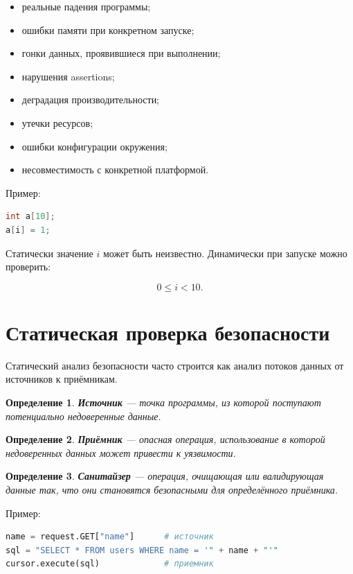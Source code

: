 \documentclass[12pt,a4paper]{article}
\newtheorem{definition}{Определение}
\begin{document}
\begin{itemize}
  \item реальные падения программы;
  \item ошибки памяти при конкретном запуске;
  \item гонки данных, проявившиеся при выполнении;
  \item нарушения assertions;
  \item деградация производительности;
  \item утечки ресурсов;
  \item ошибки конфигурации окружения;
  \item несовместимость с конкретной платформой.
\end{itemize}

Пример:

\begin{lstlisting}[language=C]
int a[10];
a[i] = 1;
\end{lstlisting}

Статически значение $i$ может быть неизвестно. Динамически при запуске можно проверить:

\[
0 \le i < 10.
\]

\section{Статическая проверка безопасности}

Статический анализ безопасности часто строится как анализ потоков данных от источников к приёмникам.

\begin{definition}
\textbf{Источник} --- точка программы, из которой поступают потенциально недоверенные данные.
\end{definition}

\begin{definition}
\textbf{Приёмник} --- опасная операция, использование в которой недоверенных данных может привести к уязвимости.
\end{definition}

\begin{definition}
\textbf{Санитайзер} --- операция, очищающая или валидирующая данные так, что они становятся безопасными для определённого приёмника.
\end{definition}

Пример:

\begin{lstlisting}[language=Python]
name = request.GET["name"]      # источник
sql = "SELECT * FROM users WHERE name = '" + name + "'"
cursor.execute(sql)             # приемник
\end{lstlisting}
\end{document}
